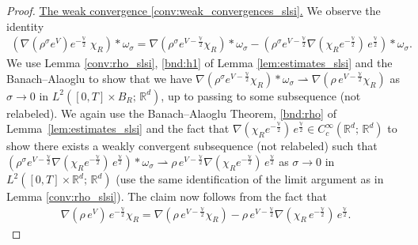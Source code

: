 \documentclass[reqno, 11pt]{amsart}
\numberwithin{equation}{section}
\theoremstyle{definition}
\begin{document}
\begin{proof}
    \underline{The weak convergence \ref{conv:weak_convergences_slsi}.} We observe the identity
    \begin{align*}
        (\nabla(\rho^\sigma e^V)e^{-\frac{\mathbb{V}}{2}}\;\chi_R)\ast\omega_\sigma=\nabla (\rho^\sigma e^{V-\frac{\mathbb{V}}{2}}\chi_R)\ast\omega_\sigma-(\rho^\sigma e^{V-\frac{\mathbb{V}}{2}} \nabla (\chi_R e^{-\frac{\mathbb{V}}{2}})\,e^{\frac{\mathbb{V}}{2}})\ast\omega_\sigma.
    \end{align*}
    We use Lemma \ref{conv:rho_slsi}, \ref{bnd:h1} of Lemma \ref{lem:estimates_slsi} and the Banach--Alaoglu to show that we have $\nabla (\rho^\sigma e^{V-\frac{\mathbb{V}}{2}}\chi_R)\ast\omega_\sigma\rightharpoonup \nabla (\rho \,e^{V-\frac{\mathbb{V}}{2}}\chi_R)$ as $\sigma\rightarrow 0$ in $L^2([0,T]\times B_R;\,\mathbb{R}^{d})$, up to passing to some subsequence (not relabeled). We again use the Banach--Alaoglu Theorem, \ref{bnd:rho} of Lemma~\ref{lem:estimates_slsi} and the fact that $\nabla (\chi_R e^{-\frac{\mathbb{V}}{2}})\, e^{\frac{\mathbb{V}}{2}}\in C_c^\infty(\mathbb{R}^{d};\,\mathbb{R}^{d})$ to show there exists a weakly convergent subsequence (not relabeled) such that $(\rho^\sigma e^{V-\frac{\mathbb{V}}{2}} \nabla (\chi_R e^{-\frac{\mathbb{V}}{2}})\,e^{\frac{\mathbb{V}}{2}})\ast\omega_\sigma\rightharpoonup \rho\, e^{V-\frac{\mathbb{V}}{2}} \nabla (\chi_R e^{-\frac{\mathbb{V}}{2}})\,e^{\frac{\mathbb{V}}{2}}$ as $\sigma\rightarrow 0$ in $L^2([0,T]\times \mathbb{R}^{d};\,\mathbb{R}^{d})$ (use the same identification of the limit argument as in Lemma \ref{conv:rho_slsi}). The claim now follows from the fact that
    \begin{align*}
        \nabla (\rho\, e^V)\,e^{-\frac{\mathbb{V}}{2}}\chi_R
        =\nabla (\rho \,e^{V-\frac{\mathbb{V}}{2}}\chi_R)-\rho\, e^{V-\frac{\mathbb{V}}{2}}\nabla(\chi_R\, e^{-\frac{\mathbb{V}}{2}})\,e^{\frac{\mathbb{V}}{2}}.
    \end{align*}
    

\end{proof}
\end{document}

